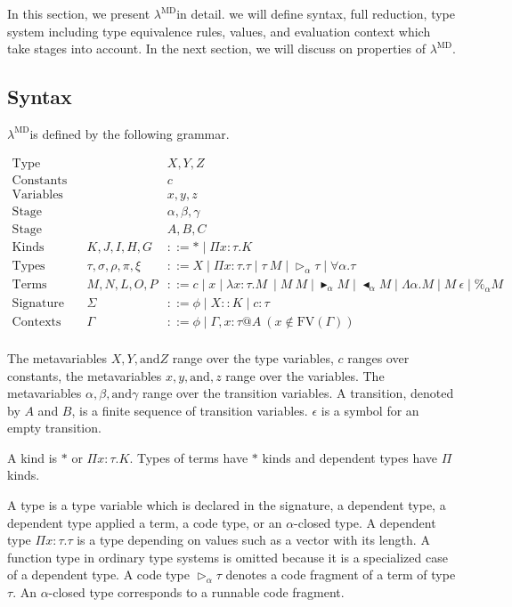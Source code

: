 \documentclass[runningheads]{llncs}
\newcommand{\LMD}{$\lambda^{\textrm{MD}}$}
\newcommand{\G}{\Gamma}
\newcommand{\TW}{\triangleright}
\newcommand{\F}{\forall}
\newcommand{\TB}{\blacktriangleright}
\newcommand{\TBL}{\blacktriangleleft}
\begin{document}
In this section, we present \LMD in detail. we will define syntax, full reduction, type system including type equivalence rules, values, and evaluation context which take stages into account.
In the next section, we will discuss on properties of \LMD.

\subsection{Syntax}

\LMD is defined by the following grammar.

\begin{align*}
    \textrm{Type variables} && & X,Y,Z \\
    \textrm{Constants} && & c \\
    \textrm{Variables} && & x,y,z \\
    \textrm{Stage variables} && & \alpha,\beta,\gamma \\
    \textrm{Stage} && & A,B,C \\
    \textrm{Kinds} && K,J,I,H,G & ::= * \mid \Pi x:\tau.K\\
    \textrm{Types} && \tau,\sigma,\rho,\pi,\xi & ::= X \mid \Pi x:\tau.\tau \mid \tau\ M \mid \TW_{\alpha} \tau \mid \F\alpha.\tau \\
    \textrm{Terms} && M,N,L,O,P & ::= c \mid x \mid \lambda x:\tau.M\ \mid M\ M \mid \TB_\alpha M 
    \mid \TBL_\alpha M \mid \Lambda\alpha.M \mid M\ \epsilon \mid \%_\alpha M\\ 
    \textrm{Signature} && \Sigma & ::= \phi \mid X::K \mid c:\tau \\
    \textrm{Contexts} && \Gamma & ::= \phi \mid  \Gamma,x:\tau@A\ (x\not\in\textrm{FV}(\G)) \\
\end{align*}

The metavariables $X, Y, \text{and} Z$ range over the type variables, $c$ ranges over constants, the metavariables $x, y, \text{and}, z$ range over the variables.
The metavariables $\alpha, \beta, \text{and} \gamma$ range over the transition variables.
A transition, denoted by $A$ and $B$, is a finite sequence of transition variables.
$\epsilon$ is a symbol for an empty transition.

A kind is $*$ or $\Pi x:\tau.K$. Types of terms have $*$ kinds and dependent types have $\Pi$ kinds.

A type is a type variable which is declared in the signature, a dependent type, a dependent type applied a term, a code type, or an $\alpha$-closed type.
A dependent type $\Pi x:\tau.\tau$ is a type depending on values such as a vector with its length.
A function type in ordinary type systems is omitted because it is a specialized case of a dependent type.
A code type $\TW_\alpha \tau$ denotes a code fragment of a term of type $\tau$.
An $\alpha$-closed type corresponds to a runnable code fragment.
\end{document}
